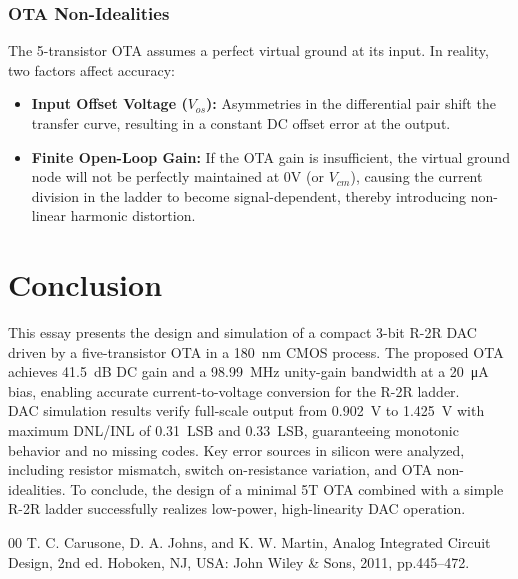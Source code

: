 \documentclass[conference]{IEEEtran}
\begin{document}
\subsubsection{OTA Non-Idealities}
The 5-transistor OTA assumes a perfect virtual ground at its input. In reality, two factors affect accuracy:
\begin{itemize}
    \item \textbf{Input Offset Voltage ($V_{os}$):} Asymmetries in the differential pair shift the transfer curve, resulting in a constant DC offset error at the output.
    \item \textbf{Finite Open-Loop Gain:} If the OTA gain is insufficient, the virtual ground node will not be perfectly maintained at 0V (or $V_{cm}$), causing the current division in the ladder to become signal-dependent, thereby introducing non-linear harmonic distortion.
\end{itemize}

\section{Conclusion}
This essay presents the design and simulation of a compact 3-bit R-2R DAC driven by a five-transistor OTA in a \SI{180}{\nano\meter} CMOS process. 
The proposed OTA achieves \SI{41.5}{\deci\bel} DC gain and a \SI{98.99}{\mega\hertz} unity-gain bandwidth at a \SI{20}{\micro\ampere} bias, enabling accurate current-to-voltage conversion for the R-2R ladder. \\
DAC simulation results verify full-scale output from \SI{0.902}{\volt} to \SI{1.425}{\volt} with maximum DNL/INL of \SI{0.31}{LSB} and \SI{0.33}{LSB}, guaranteeing monotonic behavior and no missing codes. 
Key error sources in silicon were analyzed, including resistor mismatch, switch on-resistance variation, and OTA non-idealities.
To conclude, the design of a minimal 5T OTA combined with a simple R-2R ladder successfully realizes low-power, high-linearity DAC operation.


\begin{thebibliography}{00}
 T. C. Carusone, D. A. Johns, and K. W. Martin, Analog Integrated Circuit Design, 2nd ed. Hoboken, NJ, USA: John Wiley \& Sons, 2011, pp.445--472.
\end{thebibliography}
\end{document}
